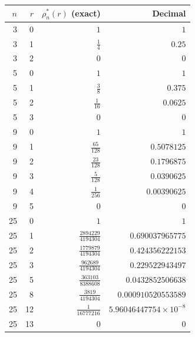 \begin{tabular}{rrrr}
\hline
$n$ & $r$ & $\rho_n^*(r)$ (exact) & Decimal \\
\hline
3 & 0 & $1$ & $1$ \\
3 & 1 & $\frac{1}{4}$ & $0.25$ \\
3 & 2 & $0$ & $0$ \\
5 & 0 & $1$ & $1$ \\
5 & 1 & $\frac{3}{8}$ & $0.375$ \\
5 & 2 & $\frac{1}{16}$ & $0.0625$ \\
5 & 3 & $0$ & $0$ \\
9 & 0 & $1$ & $1$ \\
9 & 1 & $\frac{65}{128}$ & $0.5078125$ \\
9 & 2 & $\frac{23}{128}$ & $0.1796875$ \\
9 & 3 & $\frac{5}{128}$ & $0.0390625$ \\
9 & 4 & $\frac{1}{256}$ & $0.00390625$ \\
9 & 5 & $0$ & $0$ \\
25 & 0 & $1$ & $1$ \\
25 & 1 & $\frac{2894229}{4194304}$ & $0.690037965775$ \\
25 & 2 & $\frac{1779879}{4194304}$ & $0.424356222153$ \\
25 & 3 & $\frac{962689}{4194304}$ & $0.229522943497$ \\
25 & 5 & $\frac{363103}{8388608}$ & $0.0432852506638$ \\
25 & 8 & $\frac{3819}{4194304}$ & $0.000910520553589$ \\
25 & 12 & $\frac{1}{16777216}$ & $5.96046447754\times 10^{-8}$ \\
25 & 13 & $0$ & $0$ \\
\hline
\end{tabular}
